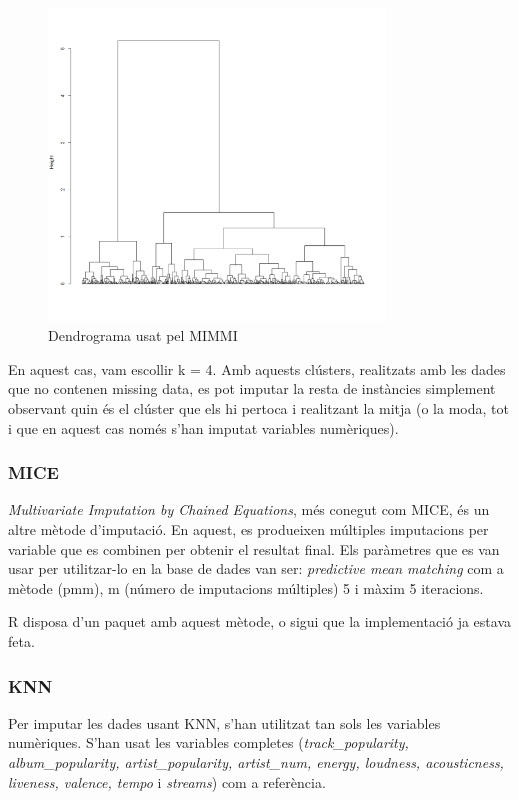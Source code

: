 \begin{figure}[H]
    \centering
    \includegraphics[width=0.8\textwidth]{Images/3_Preprocessing/mimmidend.png}
    \caption{Dendrograma usat pel MIMMI}
    \label{fig:Preprocessing_mimmi_dend}
\end{figure}

En aquest cas, vam escollir k = 4. Amb aquests clústers, realitzats amb les dades que no contenen missing data, es pot imputar la resta de instàncies simplement observant quin és el clúster que els hi pertoca i realitzant la mitja (o la moda, tot i que en aquest cas només s'han imputat variables numèriques).

\subsubsection{MICE} 
\textit{Multivariate Imputation by Chained Equations}, més conegut com MICE, és un altre mètode d'imputació. En aquest, es produeixen múltiples imputacions per variable que es combinen per obtenir el resultat final. Els paràmetres que es van usar per utilitzar-lo en la base de dades van ser: \textit{predictive mean matching} com a mètode (pmm), m (número de imputacions múltiples) 5 i màxim 5 iteracions.

R disposa d'un paquet amb aquest mètode, o sigui que la implementació ja estava feta.

\subsubsection{KNN}

Per imputar les dades usant KNN, s'han utilitzat tan sols les variables numèriques. S'han usat les variables completes (\textit{track\_popularity, album\_popularity, artist\_popularity, artist\_num, energy, loudness, acousticness, liveness, valence, tempo} i \textit{streams}) com a referència.

